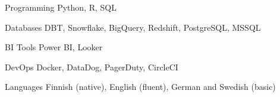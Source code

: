 

\begin{cvskills}

  \cvskill
    {Programming} %
    {Python, R, SQL} %

  \cvskill
    {Databases} %
    {DBT, Snowflake, BigQuery, Redshift, PostgreSQL, MSSQL} %

  \cvskill
    {BI Tools} %
    {Power BI, Looker} %

  \cvskill
    {DevOps} %
    {Docker, DataDog, PagerDuty, CircleCI} %

  \cvskill
    {Languages} %
    {Finnish (native), English (fluent), German and Swedish (basic)} %

\end{cvskills}
